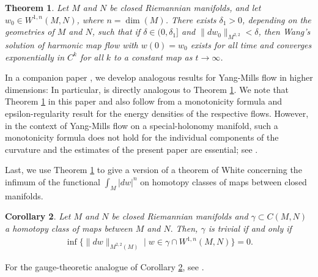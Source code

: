 \documentclass[12pt]{amsart}
\renewcommand{\1}{{\mathbf 1}}
\newtheorem{thm}{Theorem}[section]
\newtheorem{cor}[thm]{Corollary}
\theoremstyle{others}
\numberwithin{equation}{section}
\begin{document}
\begin{thm}\label{thm:regularballtheorem}
Let \(M\) and \(N\) be closed Riemannian manifolds, and let \(w_0 \in W^{1, n}(M, N)\), where \(n = \dim(M)\). There exists \(\delta_1 > 0\), depending on the geometries of \(M\) and \(N\), such that if \(\delta \in (0, \delta_1]\) and \(\|dw_0\|_{M^{2, 2}} < \delta\), %
then Wang's solution of harmonic map flow with $w(0) = w_0$ exists for all time and converges exponentially in \(C^k\) for all \(k\) to a constant map as \(t \to \infty\).
\end{thm}

 
In a companion paper \cite{gappaper}, we develop analogous results for Yang-Mills flow in higher dimensions: In particular, \cite[Theorem 1.4]{gappaper} is directly analogous to Theorem \ref{thm:regularballtheorem}. %
We note that Theorem \ref{thm:regularballtheorem} in this paper and \cite[Theorem 1.4]{gappaper} also follow from a monotonicity formula and epsilon-regularity result for the energy densities of the respective flows. However, in the context of Yang-Mills flow on a special-holonomy manifold, such a monotonicity formula does not hold for the individual components of the curvature and the estimates of the present paper are essential; see \cite[Theorem 1.3]{gappaper}. %

Last, we use Theorem \ref{thm:regularballtheorem} to %
give a version of a theorem of White \cite[Cor. 2 and 3 on pg. 128]{whitejdg} concerning the infimum of the functional \(\int_M |dw|^n\) on homotopy classes of maps between closed manifolds. 
\begin{cor}\label{gapcor}
    Let \(M\) and \(N\) be closed Riemannian manifolds and $\gamma \subset C(M,N)$ a homotopy class of maps between $M$ and $N.$ 
    Then, $\gamma$ is trivial if and only if
    \begin{align}\label{Morreyinfimum}
        \inf\{ \|dw\|_{M^{2, 2}(M)} \mid w \in \gamma \cap W^{1, n}(M, N) \} = 0. 
    \end{align}
\end{cor}
For the gauge-theoretic analogue of Corollary \ref{gapcor}, see \cite[Corollary 1.5]{gappaper}.
\end{document}
